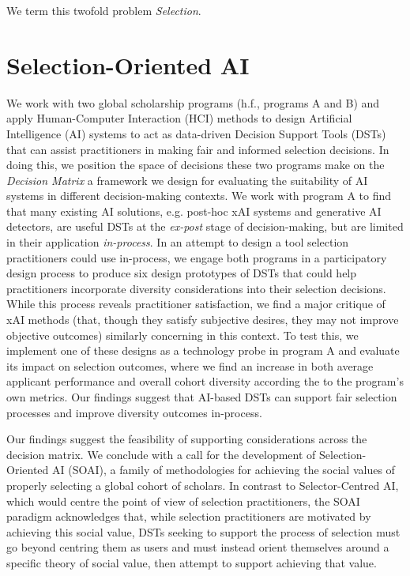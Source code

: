 We term this twofold problem \emph{Selection}.

\section{Selection-Oriented AI} %
We work with two global scholarship programs (h.f., programs A and B) and apply Human-Computer Interaction (HCI) methods to design Artificial Intelligence (AI) systems to act as data-driven Decision Support Tools (DSTs) that can assist practitioners in making fair and informed selection decisions. In doing this, we position the space of decisions these two programs make on the \emph{Decision Matrix} a framework we design for evaluating the suitability of AI systems in different decision-making contexts. We work with program A to find that many existing AI solutions, e.g. post-hoc xAI systems and generative AI detectors, are useful DSTs at the \emph{ex-post} stage of decision-making, but are limited in their application \emph{in-process}. In an attempt to design a tool selection practitioners could use in-process, we engage both programs in a participatory design process to produce six design prototypes of DSTs that could help practitioners incorporate diversity considerations into their selection decisions. While this process reveals practitioner satisfaction, we find a major critique of xAI methods (that, though they satisfy subjective desires, they may not improve objective outcomes) similarly concerning in this context. To test this, we implement one of these designs as a technology probe in program A and evaluate its impact on selection outcomes, where we find an increase in both average applicant performance and overall cohort diversity according the to the program's own metrics. Our findings suggest that AI-based DSTs can support fair selection processes and improve diversity outcomes in-process.

Our findings suggest the feasibility of supporting considerations across the decision matrix. We conclude with a call for the development of Selection-Oriented AI (SOAI), a family of methodologies for achieving the social values of properly selecting a global cohort of scholars. In contrast to Selector-Centred AI, which would centre the point of view of selection practitioners, the SOAI paradigm acknowledges that, while selection practitioners are motivated by achieving this social value, DSTs seeking to support the process of selection must go beyond centring them as users and must instead orient themselves around a specific theory of social value, then attempt to support achieving that value.


